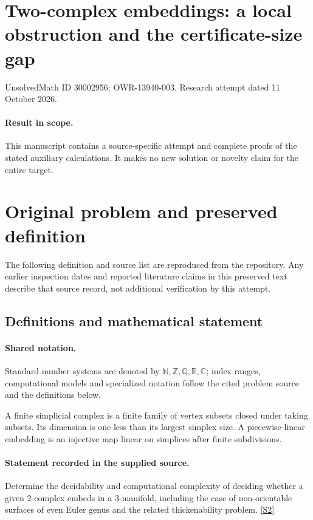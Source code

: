 \documentclass[11pt]{article}
\begin{document}
\section*{Two-complex embeddings: a local obstruction and the certificate-size gap}
\noindent UnsolvedMath ID 30002956; OWR-13940-003. Research attempt dated 11 October 2026.
\paragraph{Result in scope.}This manuscript contains a source-specific attempt and complete proofs of the stated auxiliary calculations. It makes no new solution or novelty claim for the entire target.
\section{Original problem and preserved definition}
The following definition and source list are reproduced from the repository. Any earlier inspection dates and reported literature claims in this preserved text describe that source record, not additional verification by this attempt.
\subsection{Definitions and mathematical statement}

\paragraph{Shared notation.}Standard number systems are denoted by $\mathbb N,\mathbb Z,\mathbb Q,\mathbb R,\mathbb C$; index ranges, computational models and specialized notation follow the cited problem source and the definitions below.


A finite simplicial complex is a finite family of vertex subsets closed under taking subsets. Its dimension is one less than its largest simplex size. A piecewise-linear embedding is an injective map linear on simplices after finite subdivisions.
\paragraph{Statement recorded in the supplied source.}
Determine the decidability and computational complexity of deciding whether a given 2-complex embeds in a 3-manifold, including the case of non-orientable surfaces of even Euler genus and the related thickenability problem. \href{https://doi.org/10.4171/owr/2015/45}{[S2]}
\end{document}
